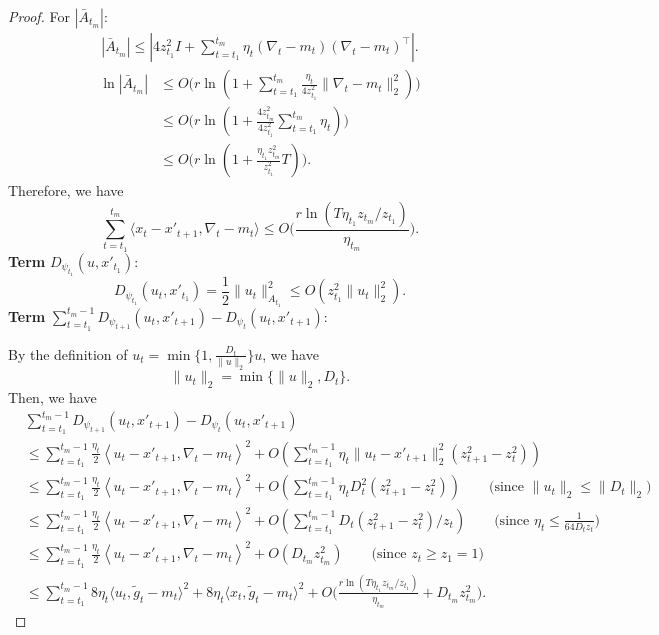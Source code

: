 \documentclass{article}
\theoremstyle{plain}
\theoremstyle{definition}
\theoremstyle{remark}
\newcommand{\inner}[2]{\left\langle #1, #2 \right\rangle}
\renewcommand{\tilde}{\widetilde}
\begin{document}
\begin{proof}
For $|\bar{A}_{t_m}|$:
\begin{align*}
|\bar{A}_{t_m}|\leq |4z_{t_1}^2 I+\sum_{t=t_1}^{t_m} \eta_t(\nabla_t-m_t)(\nabla_t-m_t)^\top|.
\end{align*}
\begin{align*}
\ln |\bar{A}_{t_m}|&\leq O\Big(r\ln(1+\sum_{t=t_1}^{t_m} \frac{\eta_t}{4z_{t_1}^2}\|\nabla_t-m_t\|_2^2)\Big)\\
&\leq O\Big(r\ln(1+\frac{4z_{t_m}^2}{4z_{t_1}^2}\sum_{t=t_1}^{t_m} \eta_t)\Big)\\
&\leq O\Big(r\ln(1+\frac{\eta_{t_1} z_{t_m}^2}{z_{t_1}^2}T)\Big).
\end{align*}
Therefore, we have
\begin{equation*}
\sum_{t=t_1}^{t_m}\langle x_{t}-x'_{t+1},\nabla_t-m_t\rangle\leq O\Big(\frac{r\ln(T\eta_{t_1} z_{t_m}/z_{t_1})}{\eta_{t_m}}\Big).
\end{equation*}
\textbf{Term} $D_{\psi_{t_1}}(u,x'_{t_1})$:
\begin{equation*}
D_{\psi_{t_1}}(u_t,x'_{t_1})=\frac{1}{2}\|u_t\|^2_{A_{t_1}}\leq O(z_{t_1}^2\|u_t\|_2^2).
\end{equation*}
\textbf{Term} $\sum_{t=t_1}^{t_m-1}D_{\psi_{t+1}}(u_t,x'_{t+1})-D_{\psi_t}(u_t,x'_{t+1})$: 

By the definition of $u_t = \min\{ 1, \frac{D_t}{\| u \|_2}\} u$, we have
\begin{equation*}
\|u_t\|_2=\min\{\|u\|_2,D_t\}.
\end{equation*}
Then, we have
\begin{align*}
&\sum_{t=t_1}^{t_m-1}D_{\psi_{t+1}}(u_t,x'_{t+1})-D_{\psi_t}(u_t,x'_{t+1})\\
&\leq\sum_{t=t_1}^{t_m-1} \frac{\eta_t}{2}\inner{u_t-x'_{t+1}}{\nabla_t-m_t}^2+O(\sum_{t=t_1}^{t_m-1} \eta_t\|u_t-x'_{t+1}\|_2^2(z^2_{t+1}-z_t^2))\\
&\leq \sum_{t=t_1}^{t_m-1} \frac{\eta_t}{2}\inner{u_t-x'_{t+1}}{\nabla_t-m_t}^2+O(\sum_{t=t_1}^{t_m-1} \eta_tD_t^2(z^2_{t+1}-z_t^2)) \qquad \text{(since $\|u_t\|_2\leq \|D_t\|_2$)}\\
&\leq \sum_{t=t_1}^{t_m-1} \frac{\eta_t}{2}\inner{u_t-x'_{t+1}}{\nabla_t-m_t}^2+O(\sum_{t=t_1}^{t_m-1} D_t(z^2_{t+1}-z_t^2)/z_t) \qquad \text{(since $\eta_t\leq\frac{1}{64D_tz_t}$)}\\
&\leq \sum_{t=t_1}^{t_m-1} \frac{\eta_t}{2}\inner{u_t-x'_{t+1}}{\nabla_t-m_t}^2+O(D_{t_m}z^2_{t_m})  \qquad \text{(since $z_t\geq z_1=1$)}\\
&\leq \sum_{t={t_1}}^{t_m-1} 8\eta_t\langle u_t,\tilde{g}_t-m_t\rangle^2+8\eta_t\langle x_{t},\tilde{g}_t-m_t\rangle^2+O\Big(\frac{r\ln(T\eta_{t_1} z_{t_m}/z_{t_1})}{\eta_{t_m}}+D_{t_m}z^2_{t_m}\Big).
\end{align*}


\end{proof}
\end{document}
